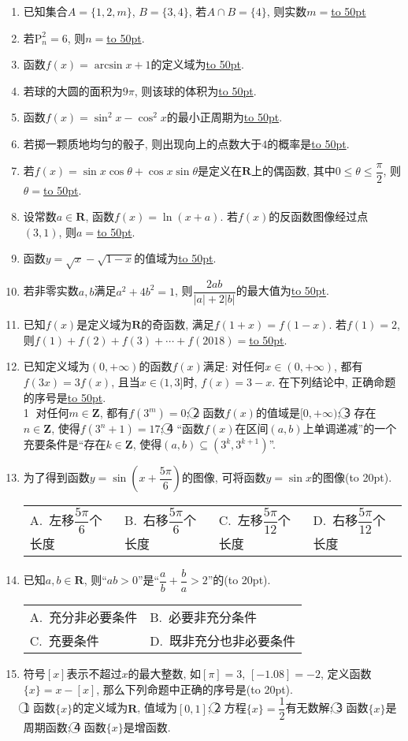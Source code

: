 \documentclass[10pt,a4paper]{article}
\newcommand{\blank}[1]{\underline{\hbox to #1pt{}}}
\newcommand{\bracket}[1]{(\hbox to #1pt{})}
\newcommand{\twoch}[4]{\par\begin{tabular}{p{.46\textwidth}p{.46\textwidth}}
A.~#1& B.~#2\\
C.~#3& D.~#4
\end{tabular}}
\newcommand{\fourch}[4]{\par\begin{tabular}{p{.23\textwidth}p{.23\textwidth}p{.23\textwidth}p{.23\textwidth}}
A.~#1 &B.~#2& C.~#3& D.~#4
\end{tabular}}
\begin{document}
\begin{enumerate}[1.]
\item 已知集合$A=\{1,2,m\}$, $B=\{3,4\}$, 若$A\cap B=\{4\}$, 则实数$m=$\blank{50}
\item 若$\mathrm{P}_n^2=6$, 则$n=$\blank{50}.
\item 函数$f(x)=\arcsin x+1$的定义域为\blank{50}.
\item 若球的大圆的面积为$9\pi$, 则该球的体积为\blank{50}.
\item 函数$f(x)=\sin^2 x-\cos^2 x$的最小正周期为\blank{50}.
\item 若掷一颗质地均匀的骰子, 则出现向上的点数大于$4$的概率是\blank{50}.
\item 若$f(x)=\sin x\cos \theta+\cos x\sin\theta$是定义在$\mathbf{R}$上的偶函数, 其中$0\le \theta\le \dfrac \pi 2$, 则$\theta=$\blank{50}.
\item 设常数$a\in \mathbf{R}$, 函数$f(x)=\ln (x+a)$. 若$f(x)$的反函数图像经过点$(3,1)$, 则$a=$\blank{50}.
\item 函数$y=\sqrt{x}-\sqrt{1-x}$的值域为\blank{50}.
\item 若非零实数$a,b$满足$a^2+4b^2=1$, 则$\dfrac{2ab}{|a|+2|b|}$的最大值为\blank{50}.
\item 已知$f(x)$是定义域为$\mathbf{R}$的奇函数, 满足$f(1+x)=f(1-x)$. 若$f(1)=2$, 则$f(1)+f(2)+f(3)+\cdots+f(2018)=$\blank{50}.
\item 已知定义域为$(0,+\infty)$的函数$f(x)$满足: 对任何$x\in (0,+\infty)$, 都有$f(3x)=3f(x)$, 且当$x\in (1,3]$时, $f(x)=3-x$. 在下列结论中, 正确命题的序号是\blank{50}.\\
\textcircled{1} 对任何$m\in \mathbf{Z}$, 都有$f(3^m)=0$; \textcircled{2} 函数$f(x)$的值域是$[0,+\infty)$; \textcircled{3} 存在$n\in \mathbf{Z}$, 使得$f(3^n+1)=17$; \textcircled{4} ``函数$f(x)$在区间$(a,b)$上单调递减''的一个充要条件是``存在$k\in \mathbf{Z}$, 使得$(a,b)\subseteq (3^k,3^{k+1})$''.
\item 为了得到函数$y=\sin(x+\dfrac {5\pi}{6})$的图像, 可将函数$y=\sin x$的图像\bracket{20}.
\fourch{左移$\dfrac{5\pi}6$个长度}{右移$\dfrac{5\pi}6$个长度}{左移$\dfrac{5\pi}{12}$个长度}{右移$\dfrac{5\pi}{12}$个长度}
\item 已知$a,b\in \mathbf{R}$, 则``$ab>0$''是``$\dfrac ab+\dfrac ba>2$''的\bracket{20}.
\twoch{充分非必要条件}{必要非充分条件}{充要条件}{既非充分也非必要条件}
\item 符号$[x]$表示不超过$x$的最大整数, 如$[\pi]=3$, $[-1.08]=-2$, 定义函数$\{x\}=x-[x]$, 那么下列命题中正确的序号是\bracket{20}.\\
\textcircled{1} 函数$\{x\}$的定义域为$\mathbf{R}$, 值域为$[0,1]$; \textcircled{2} 方程$\{x\}=\dfrac 12$有无数解; \textcircled{3} 函数$\{x\}$是周期函数; \textcircled{4} 函数$\{x\}$是增函数.

\end{enumerate}
\end{document}
